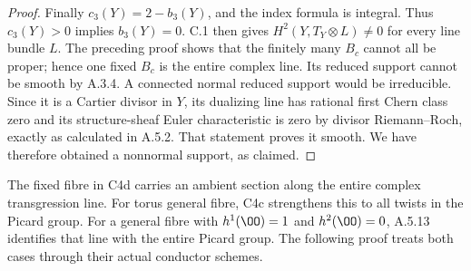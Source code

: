 \begin{proof}
Finally $c_3(Y)=2-b_3(Y)$, and the index formula is integral. Thus $c_3(Y)>0$ implies $b_3(Y)=0$. C.1 then gives $H^2(Y,T_Y\otimes L)\ne0$ for every line bundle $L$. The preceding proof shows that the finitely many $B_c$ cannot all be proper; hence one fixed $B_c$ is the entire complex line. Its reduced support cannot be smooth by A.3.4. A connected normal reduced support would be irreducible. Since it is a Cartier divisor in $Y$, its dualizing line has rational first Chern class zero and its structure-sheaf Euler characteristic is zero by divisor Riemann--Roch, exactly as calculated in A.5.2. That statement proves it smooth. We have therefore obtained a nonnormal support, as claimed.
\end{proof}

The fixed fibre in C4d carries an ambient section along the entire complex transgression line. For torus general fibre, C4c strengthens this to all twists in the Picard group. For a general fibre with $h^1(\OO)=1$ and $h^2(\OO)=0$, A.5.13 identifies that line with the entire Picard group. The following proof treats both cases through their actual conductor schemes.

